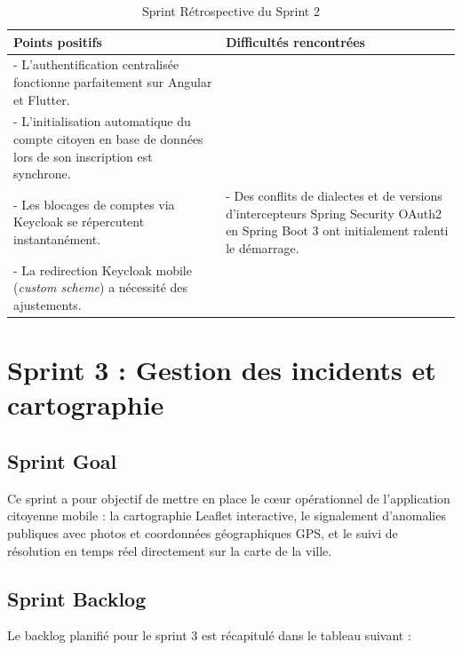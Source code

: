 \begin{table}[H]
    \centering
    \caption{Sprint Rétrospective du Sprint 2}
    \label{tab:retro_sprint2}
    \vspace{0.2cm}
    \small
    \begin{tabularx}{\textwidth}{|X|X|}
        \hline
        \textbf{Points positifs} & \textbf{Difficultés rencontrées} \\ \hline
        - L'authentification centralisée fonctionne parfaitement sur Angular et Flutter.\\
        - L'initialisation automatique du compte citoyen en base de données lors de son inscription est synchrone.\\
        - Les blocages de comptes via Keycloak se répercutent instantanément. & 
        - Des conflits de dialectes et de versions d'intercepteurs Spring Security OAuth2 en Spring Boot 3 ont initialement ralenti le démarrage.\\
        - La redirection Keycloak mobile (\textit{custom scheme}) a nécessité des ajustements. \\
        \hline
    \end{tabularx}
\end{table}

\section{Sprint 3 : Gestion des incidents et cartographie}

\subsection{Sprint Goal}
Ce sprint a pour objectif de mettre en place le cœur opérationnel de l'application citoyenne mobile : la cartographie Leaflet interactive, le signalement d'anomalies publiques avec photos et coordonnées géographiques GPS, et le suivi de résolution en temps réel directement sur la carte de la ville.

\subsection{Sprint Backlog}
Le backlog planifié pour le sprint 3 est récapitulé dans le tableau suivant :

